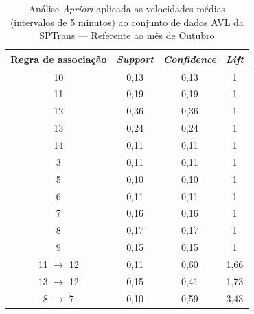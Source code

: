\documentclass[
	12pt,				%
	oneside,			%
	a4paper,			%
	english,			%
	brazil				%
	]{abntex2ppgsi}
\begin{document}
{{{\begin{apendicesenv}
\begin{table}[!htb]
\centering
\caption {Análise \textit{Apriori} aplicada as velocidades médias (intervalos de 5 minutos) ao conjunto de dados AVL da SPTrans --- Referente ao mês de Outubro}
\label {tab:aprioriOctober}
\begin{tabular}{c|c|c|c}
\toprule
\textbf{Regra de associação} & \textit{\textbf{Support}} & \textit{\textbf{Confidence}} & \textit{\textbf{Lift}} \\
\midrule
10 &  0,13 &  0,13 &  1\\
\hline
11 &  0,19 &  0,19 &  1\\
\hline
12 &  0,36 &  0,36 &  1\\
\hline
13 &  0,24 &  0,24 &  1\\
\hline
14 &  0,11 &  0,11 &  1\\
\hline
3 &  0,11 &  0,11 &  1\\
\hline
5 &  0,10 &  0,10 &  1\\
\hline
6 &  0,11 &  0,11 &  1\\
\hline
7 &  0,16 &  0,16 &  1\\
\hline
8 &  0,17 &  0,17 &  1\\
\hline
9 &  0,15 &  0,15 &  1\\
\hline
11 $\rightarrow$ 12 &  0,11 &  0,60 &  1,66\\
\hline
13 $\rightarrow$ 12 &  0,15 &  0,41 &  1,73\\
\hline
8 $\rightarrow$ 7 &  0,10 &  0,59 &  3,43\\
\bottomrule
\end{tabular}
\end{table}



\end{apendicesenv}}}}
\end{document}
